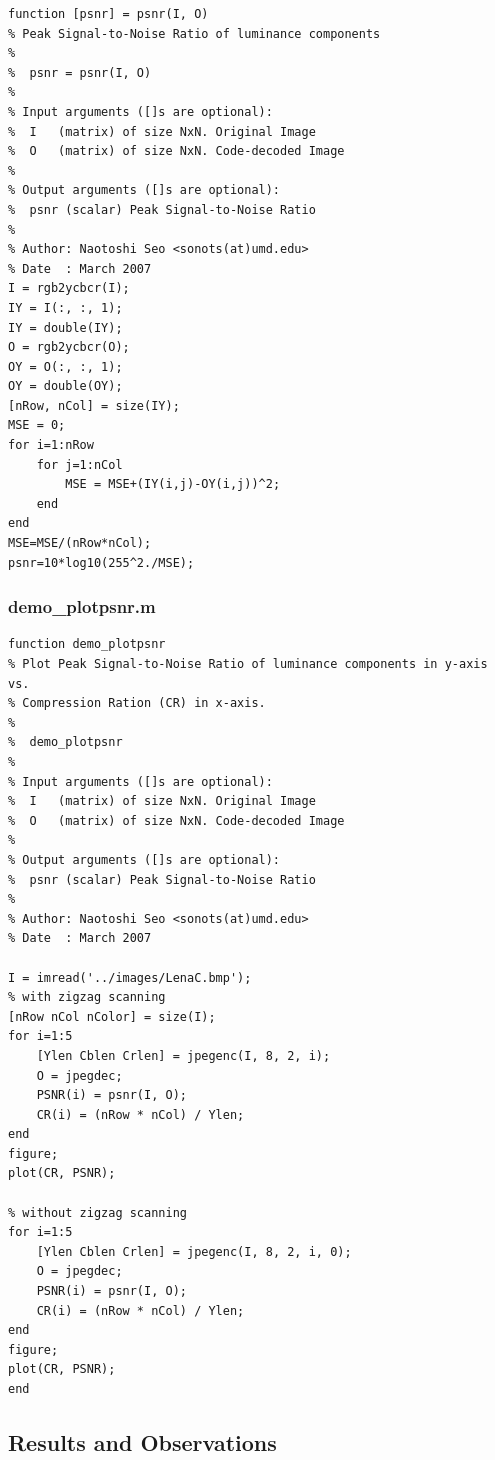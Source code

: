 \documentclass[12pt]{article}
\begin{document}
\begin{verbatim}
function [psnr] = psnr(I, O)
% Peak Signal-to-Noise Ratio of luminance components
%
%  psnr = psnr(I, O)
%
% Input arguments ([]s are optional):
%  I   (matrix) of size NxN. Original Image
%  O   (matrix) of size NxN. Code-decoded Image
%
% Output arguments ([]s are optional):
%  psnr (scalar) Peak Signal-to-Noise Ratio
%
% Author: Naotoshi Seo <sonots(at)umd.edu>
% Date  : March 2007
I = rgb2ycbcr(I);
IY = I(:, :, 1);
IY = double(IY);
O = rgb2ycbcr(O);
OY = O(:, :, 1);
OY = double(OY);
[nRow, nCol] = size(IY);
MSE = 0;
for i=1:nRow
    for j=1:nCol
        MSE = MSE+(IY(i,j)-OY(i,j))^2;
    end
end
MSE=MSE/(nRow*nCol);
psnr=10*log10(255^2./MSE);
\end{verbatim}

\subsubsection{demo\_plotpsnr.m}

\begin{verbatim}
function demo_plotpsnr
% Plot Peak Signal-to-Noise Ratio of luminance components in y-axis vs.
% Compression Ration (CR) in x-axis.
%  
%  demo_plotpsnr
%
% Input arguments ([]s are optional):
%  I   (matrix) of size NxN. Original Image
%  O   (matrix) of size NxN. Code-decoded Image
%
% Output arguments ([]s are optional):
%  psnr (scalar) Peak Signal-to-Noise Ratio
%
% Author: Naotoshi Seo <sonots(at)umd.edu>
% Date  : March 2007

I = imread('../images/LenaC.bmp');
% with zigzag scanning
[nRow nCol nColor] = size(I);
for i=1:5
    [Ylen Cblen Crlen] = jpegenc(I, 8, 2, i);
    O = jpegdec;
    PSNR(i) = psnr(I, O);
    CR(i) = (nRow * nCol) / Ylen;
end
figure;
plot(CR, PSNR);

% without zigzag scanning
for i=1:5
    [Ylen Cblen Crlen] = jpegenc(I, 8, 2, i, 0);
    O = jpegdec;
    PSNR(i) = psnr(I, O);
    CR(i) = (nRow * nCol) / Ylen;
end
figure;
plot(CR, PSNR);
end
\end{verbatim}

\subsection{Results and Observations}
\end{document}
